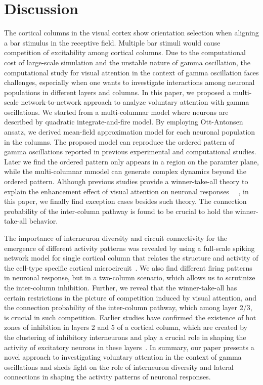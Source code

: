 \documentclass[10pt,letterpaper]{article}
\begin{document}
\section*{Discussion}
The cortical columns in the visual cortex show orientation selection when aligning a bar stimulus in the receptive field. Multiple bar stimuli would cause competition of excitability among cortical columns. Due to the computational cost of large-scale simulation and the unstable nature of gamma oscillation, the computational study for visual attention in the context of gamma oscillation faces challenges, especially when one wants to investigate interactions among neuronal populations in different layers and columns. In this paper, we proposed a multi-scale network-to-network approach to analyze voluntary attention with gamma oscillations. We started from a multi-columnar model where neurons are described by quadratic integrate-and-fire model. By employing Ott-Antonsen ansatz, we derived mean-field approximation model for each neuronal population in the columns. The proposed model can reproduce the ordered pattern of gamma oscillations reported in previous experimental and computational studies. Later we find the ordered pattern only appears in a region on the paramter plane, while the multi-columnar mmodel can generate complex dynamics beyond the ordered pattern.
Although previous studies provide a winner-take-all theory to explain the enhancement effect of visual attention on neuronal responses ~\cite{fukai1997}~\cite{wagatsuma2011}, in this paper, we finally find exception cases besides such theory. The connection probability of the inter-column pathway is found to be crucial to hold the winner-take-all behavior.

The importance of interneuron diversity and circuit connectivity for the emergence of different activity patterns was revealed by using a full-scale spiking network model for single cortical column that relates the structure and activity of the cell-type specific cortical microcircuit~\cite{potjans2012}. We also find different firing patterns in neuronal response, but in a two-column scenario, which allows us to scrutinize the inter-column inhibition.
Further, we reveal that the winner-take-all has certain restrictions in the picture of competition induced by visual attention, and the connection probability of the inter-column pathway, which among layer 2/3, is crucial in such competition. 
Earlier studies have confirmed the existence of hot zones of inhibition in layers 2 and 5 of a cortical column, which are created by the clustering of inhibitory interneurons and play a crucial role in shaping the activity of excitatory neurons in these layers~\cite{meyer2011}. In summary, our paper presents a novel approach to investigating voluntary attention in the context of gamma oscillations and sheds light on the role of interneuron diversity and lateral connections in shaping the activity patterns of neuronal responses.
\end{document}
